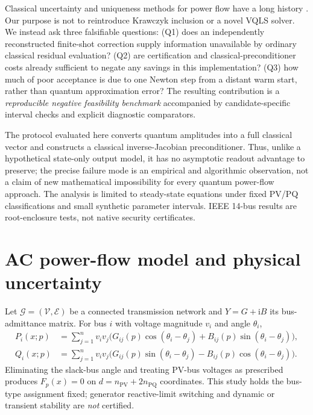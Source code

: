 \documentclass[11pt,a4paper]{article}
\theoremstyle{remark}\newtheorem{remark}[theorem]{Remark}
\begin{document}
Classical uncertainty and uniqueness methods for power flow have a long history \citep{wang1992,pereira2012,krawczyk1969,neumaier1990,rump2010}. Our purpose is not to reintroduce Krawczyk inclusion or a novel VQLS solver. We instead ask three falsifiable questions: (Q1) does an independently reconstructed finite-shot correction supply information unavailable by ordinary classical residual evaluation? (Q2) are certification and classical-preconditioner costs already sufficient to negate any savings in this implementation? (Q3) how much of poor acceptance is due to one Newton step from a distant warm start, rather than quantum approximation error? The resulting contribution is a \emph{reproducible negative feasibility benchmark} accompanied by candidate-specific interval checks and explicit diagnostic comparators.

The protocol evaluated here converts quantum amplitudes into a full classical vector and constructs a classical inverse-Jacobian preconditioner. Thus, unlike a hypothetical state-only output model, it has no asymptotic readout advantage to preserve; the precise failure mode is an empirical and algorithmic observation, not a claim of new mathematical impossibility for every quantum power-flow approach. The analysis is limited to steady-state equations under fixed PV/PQ classifications and small synthetic parameter intervals. IEEE 14-bus results are root-enclosure tests, not native security certificates.

\section{AC power-flow model and physical uncertainty}
Let $\mathcal G=(\mathcal V,\mathcal E)$ be a connected transmission network and $Y=G+\mathrm i B$ its bus-admittance matrix. For bus $i$ with voltage magnitude $v_i$ and angle $\theta_i$,
\begin{align}
P_i(x;p)&=\sum_{j=1}^n v_i v_j\bigl(G_{ij}(p)\cos(\theta_i-\theta_j)+B_{ij}(p)\sin(\theta_i-\theta_j)\bigr),\\
Q_i(x;p)&=\sum_{j=1}^n v_i v_j\bigl(G_{ij}(p)\sin(\theta_i-\theta_j)-B_{ij}(p)\cos(\theta_i-\theta_j)\bigr).
\end{align}
Eliminating the slack-bus angle and treating PV-bus voltages as prescribed produces $F_p(x)=0$ on $d=n_{\mathrm{PV}}+2n_{\mathrm{PQ}}$ coordinates. This study holds the bus-type assignment fixed; generator reactive-limit switching and dynamic or transient stability are \emph{not} certified.
\end{document}
